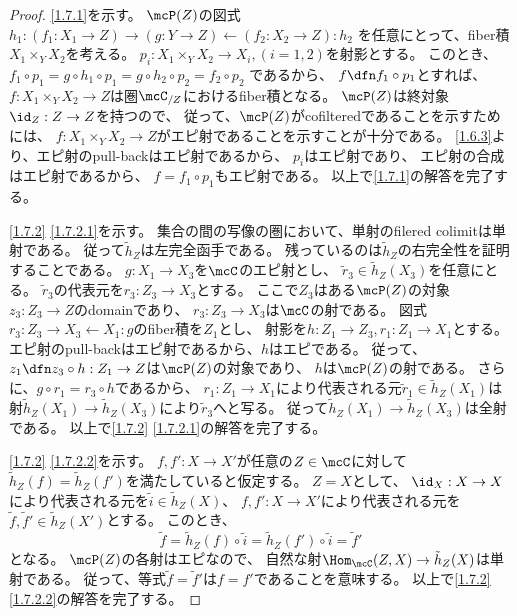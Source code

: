 \documentclass[uplatex,dvipdfmx]{jsarticle}
\begin{document}
\begin{proof}
  \ref{1.7.1}を示す。
  \(\mcP(Z)\)の図式
  \(h_1: (f_1:X_1\to Z) \to (g:Y\to Z) \gets (f_2:X_2\to Z) : h_2\)
  を任意にとって、fiber積\(X_1\times_Y X_2\)を考える。
  \(p_i: X_1\times_Y X_2\to X_i , (i=1,2)\)を射影とする。
  このとき、\(f_1\circ p_1 = g\circ h_1\circ p_1 = g\circ h_2\circ p_2 = f_2\circ p_2\)
  であるから、
  \(f\dfn f_1\circ p_1\)とすれば、
  \(f:X_1\times_Y X_2\to Z\)は圏\(\mcC_{/Z}\)におけるfiber積となる。
  \(\mcP(Z)\)は終対象\(\id_Z:Z\to Z\)を持つので、
  従って、\(\mcP(Z)\)がcofilteredであることを示すためには、
  \(f:X_1\times_Y X_2 \to Z\)がエピ射であることを示すことが十分である。
  \autoref{1.6.3}より、エピ射のpull-backはエピ射であるから、
  \(p_i\)はエピ射であり、
  エピ射の合成はエピ射であるから、
  \(f = f_1\circ p_1\)もエピ射である。
  以上で\ref{1.7.1}の解答を完了する。

  \ref{1.7.2} \ref{1.7.2.1}を示す。
  集合の間の写像の圏において、単射のfilered colimitは単射である。
  従って\(\tilde{h}_Z\)は左完全函手である。
  残っているのは\(\tilde{h}_Z\)の右完全性を証明することである。
  \(g:X_1\to X_3\)を\(\mcC\)のエピ射とし、
  \(\tilde{r}_3\in \tilde{h}_Z(X_3)\)を任意にとる。
  \(\tilde{r}_3\)の代表元を\(r_3:Z_3\to X_3\)とする。
  ここで\(Z_3\)はある\(\mcP(Z)\)の対象\(z_3:Z_3\to Z\)のdomainであり、
  \(r_3:Z_3\to X_3\)は\(\mcC\)の射である。
  図式\(r_3:Z_3\to X_3\gets X_1: g\)のfiber積を\(Z_1\)とし、
  射影を\(h:Z_1\to Z_3, r_1:Z_1\to X_1\)とする。
  エピ射のpull-backはエピ射であるから、\(h\)はエピである。
  従って、\(z_1\dfn z_3\circ h:Z_1\to Z\)は\(\mcP(Z)\)の対象であり、
  \(h\)は\(\mcP(Z)\)の射である。
  さらに、\(g\circ r_1 = r_3\circ h\)であるから、
  \(r_1:Z_1\to X_1\)により代表される元\(\tilde{r}_1\in \tilde{h}_Z(X_1)\)は
  射\(\tilde{h}_Z(X_1)\to \tilde{h}_Z(X_3)\)により\(\tilde{r}_3\)へと写る。
  従って\(\tilde{h}_Z(X_1)\to \tilde{h}_Z(X_3)\)は全射である。
  以上で\ref{1.7.2} \ref{1.7.2.1}の解答を完了する。

  \ref{1.7.2} \ref{1.7.2.2}を示す。
  \(f,f':X\to X'\)が任意の\(Z\in \mcC\)に対して
  \(\tilde{h}_Z(f) = \tilde{h}_Z(f')\)を満たしていると仮定する。
  \(Z=X\)として、
  \(\id_X:X\to X\)により代表される元を\(\tilde{i}\in \tilde{h}_Z(X)\)、
  \(f,f':X\to X'\)により代表される元を\(\tilde{f},\tilde{f}'\in \tilde{h}_Z(X')\)とする。
  このとき、
  \[
  \tilde{f} = \tilde{h}_Z(f)\circ \tilde{i}
  = \tilde{h}_Z(f')\circ \tilde{i} = \tilde{f}'
  \]
  となる。
  \(\mcP(Z)\)の各射はエピなので、
  自然な射\(\Hom_{\mcC}(Z,X)\to \tilde{h}_Z(X)\)は単射である。
  従って、等式\(\tilde{f}=\tilde{f}'\)は\(f=f'\)であることを意味する。
  以上で\ref{1.7.2} \ref{1.7.2.2}の解答を完了する。


\end{proof}
\end{document}
